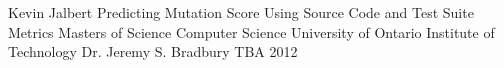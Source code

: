 



\thesisTitle
  {Kevin Jalbert}
  {Predicting Mutation Score Using Source Code and Test Suite Metrics}
  {Masters of Science}
  {Computer Science}
  {University of Ontario Institute of Technology}
  {Dr. Jeremy S. Bradbury}
  {TBA}
  {2012}




\singlespacing
\tableofcontents
\listoffigures
\listoftables
\printglossary[style=list]
\clearpage
\doublespacing










\begin{spacing}{1.0}
  
  
\end{spacing}



